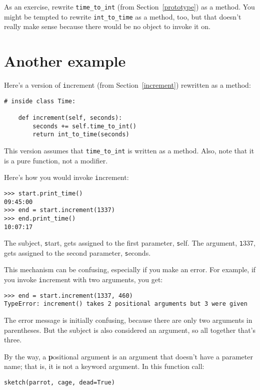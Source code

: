 \documentclass[
DIV=11,
fontsize=13,
twoside,
headinclude=false,
titlepage=firstiscover,
abstract=true,
headsepline=true,
footsepline=true,
chapterprefix=true, %
headings=big,
bibliography=totoc,%
captions=tableheading
]{scrbook}
\theoremstyle{definition}
\begin{document}
As an exercise, rewrite \verb"time_to_int" (from
Section~\ref{prototype}) as a method.  You might be tempted to
rewrite \verb"int_to_time" as a method, too, but that doesn't
really make sense because there would be no object to invoke
it on.


\section{Another example}

Here's a version of {\texttt increment} (from Section~\ref{increment})
rewritten as a method:

\begin{lstlisting}
# inside class Time:

    def increment(self, seconds):
        seconds += self.time_to_int()
        return int_to_time(seconds)
\end{lstlisting}
%
This version assumes that \verb"time_to_int" is written
as a method.  Also, note that
it is a pure function, not a modifier.

Here's how you would invoke {\texttt increment}:

\begin{lstlisting}
>>> start.print_time()
09:45:00
>>> end = start.increment(1337)
>>> end.print_time()
10:07:17
\end{lstlisting}
%
The subject, {\texttt start}, gets assigned to the first parameter,
{\texttt self}.  The argument, {\texttt 1337}, gets assigned to the
second parameter, {\texttt seconds}.

This mechanism can be confusing, especially if you make an error.
For example, if you invoke {\texttt increment} with two arguments, you
get:

\begin{lstlisting}
>>> end = start.increment(1337, 460)
TypeError: increment() takes 2 positional arguments but 3 were given
\end{lstlisting}
%
The error message is initially confusing, because there are
only two arguments in parentheses.  But the subject is also
considered an argument, so all together that's three.

By the way, a {\textbf positional argument} is an argument that
doesn't have a parameter name; that is, it is not a keyword
argument.  In this function call:

\begin{lstlisting}
sketch(parrot, cage, dead=True)
\end{lstlisting}
\end{document}
